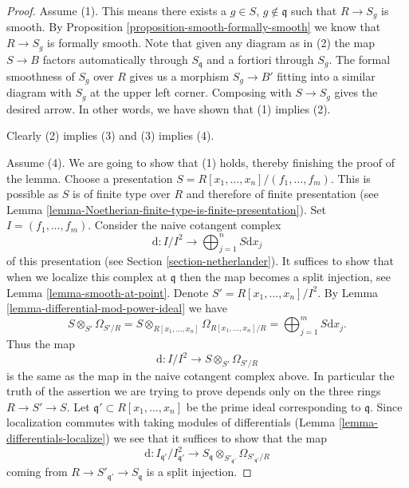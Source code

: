 \begin{proof}
Assume (1). This means there exists a $g \in S$, $g \not \in \mathfrak q$
such that $R \to S_g$ is smooth. By
Proposition \ref{proposition-smooth-formally-smooth}
we know that $R \to S_g$ is formally smooth. Note that given any diagram
as in (2) the map $S \to B$ factors automatically through $S_{\mathfrak q}$
and a fortiori through $S_g$. The formal smoothness of $S_g$ over $R$
gives us a morphism $S_g \to B'$ fitting into a similar diagram with $S_g$ at
the upper left corner. Composing with $S \to S_g$ gives the desired arrow.
In other words, we have shown that (1) implies (2).

\medskip\noindent
Clearly (2) implies (3) and (3) implies (4).

\medskip\noindent
Assume (4). We are going to show that (1) holds, thereby finishing the
proof of the lemma. Choose a presentation
$S = R[x_1, \ldots, x_n]/(f_1, \ldots, f_m)$.
This is possible as $S$ is of finite type over $R$ and therefore of finite
presentation (see
Lemma \ref{lemma-Noetherian-finite-type-is-finite-presentation}).
Set $I = (f_1, \ldots, f_m)$.
Consider the naive cotangent complex
$$
\text{d} : I/I^2
\longrightarrow
\bigoplus\nolimits_{j = 1}^n S\text{d}x_j
$$
of this presentation (see Section \ref{section-netherlander}).
It suffices to show that when we localize this complex at $\mathfrak q$
then the map becomes a split injection, see Lemma \ref{lemma-smooth-at-point}.
Denote $S' = R[x_1, \ldots, x_n]/I^2$.
By Lemma \ref{lemma-differential-mod-power-ideal} we have
$$
S \otimes_{S'} \Omega_{S'/R} =
S \otimes_{R[x_1, \ldots, x_n]} \Omega_{R[x_1, \ldots, x_n]/R} =
\bigoplus\nolimits_{j = 1}^m S\text{d}x_j.
$$
Thus the map
$$
\text{d} :
I/I^2
\longrightarrow
S \otimes_{S'} \Omega_{S'/R}
$$
is the same as the map in the naive cotangent complex above. In particular
the truth of the assertion we are trying to prove
depends only on the three rings $R \to S' \to S$.
Let $\mathfrak q' \subset R[x_1, \ldots, x_n]$ be the prime ideal
corresponding to $\mathfrak q$. Since
localization commutes with taking modules of differentials
(Lemma \ref{lemma-differentials-localize}) we see that it suffices to show
that the map
\begin{equation}
\label{equation-target-map}
\text{d} :
I_{\mathfrak q'}/I_{\mathfrak q'}^2
\longrightarrow
S_{\mathfrak q} \otimes_{S'_{\mathfrak q'}} \Omega_{S'_{\mathfrak q'}/R}
\end{equation}
coming from $R \to S'_{\mathfrak q'} \to S_{\mathfrak q}$
is a split injection.


\end{proof}

